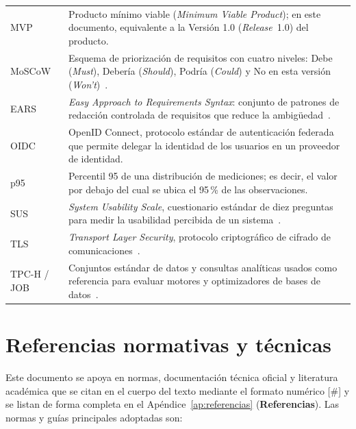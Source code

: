 \documentclass[11pt,a4paper]{report}
\begin{document}
\begin{xltabular}{\linewidth}{@{}lX@{}}
MVP & Producto m\'inimo viable (\textit{Minimum Viable Product}); en este documento, equivalente a la Versi\'on 1.0 (\textit{Release}~1.0) del producto. \\
MoSCoW & Esquema de priorizaci\'on de requisitos con cuatro niveles: Debe (\textit{Must}), Deber\'ia (\textit{Should}), Podr\'ia (\textit{Could}) y No en esta versi\'on (\textit{Won't})~\cite{R24}. \\
EARS & \textit{Easy Approach to Requirements Syntax}: conjunto de patrones de redacci\'on controlada de requisitos que reduce la ambig\"uedad~\cite{R23}. \\
OIDC & OpenID Connect, protocolo est\'andar de autenticaci\'on federada que permite delegar la identidad de los usuarios en un proveedor de identidad. \\
p95 & Percentil 95 de una distribuci\'on de mediciones; es decir, el valor por debajo del cual se ubica el 95\,\% de las observaciones. \\
SUS & \textit{System Usability Scale}, cuestionario est\'andar de diez preguntas para medir la usabilidad percibida de un sistema~\cite{R28}. \\
TLS & \textit{Transport Layer Security}, protocolo criptogr\'afico de cifrado de comunicaciones~\cite{R15}. \\
TPC-H / JOB & Conjuntos est\'andar de datos y consultas anal\'iticas usados como referencia para evaluar motores y optimizadores de bases de datos~\cite{R21,R20}. \\
\end{xltabular}

\section{Referencias normativas y t\'ecnicas}

Este documento se apoya en normas, documentaci\'on t\'ecnica oficial y literatura acad\'emica que se citan en el cuerpo del texto mediante el formato numérico [\#] y se listan de forma completa en el Ap\'endice~\ref{ap:referencias} (\textbf{Referencias}). Las normas y gu\'ias principales adoptadas son:
\end{document}
